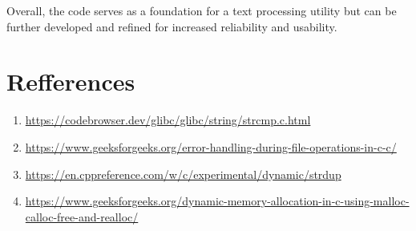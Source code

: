 \documentclass[12pt]{article}
\begin{document}
Overall, the code serves as a foundation for a text processing utility but can be further developed and refined for increased reliability and usability.

\section*{Refferences}
\hspace{0.8cm}
\begin{enumerate}
    \item \url{https://codebrowser.dev/glibc/glibc/string/strcmp.c.html}
    \item \url{https://www.geeksforgeeks.org/error-handling-during-file-operations-in-c-c/}
    \item \url{https://en.cppreference.com/w/c/experimental/dynamic/strdup}
    \item \url{https://www.geeksforgeeks.org/dynamic-memory-allocation-in-c-using-malloc-calloc-free-and-realloc/}
\end{enumerate}


\pagebreak
\end{document}
